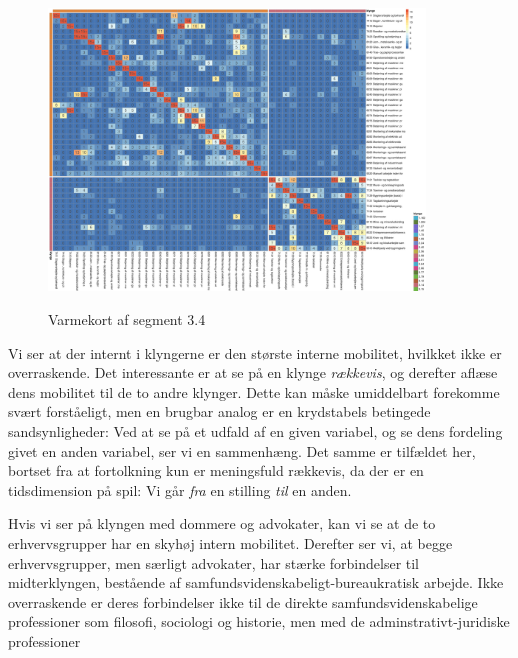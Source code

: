 % 
%
%
\begin{figure}
  \vspace{-20pt}
  \begin{center}
    \caption{Varmekort af segment 3.4}
      \includegraphics[width=10cm]{fig/heatmaps/seg3_4_RR_10.pdf}
    \label{fig delanalyse2 heatmap seg3.4 ledighed}
  \end{center}
  \vspace{-20pt}
\end{figure}

Vi ser at der internt i klyngerne er den største interne mobilitet, hvilkket ikke er overraskende. Det interessante er at se på en klynge \emph{rækkevis}, og derefter aflæse dens mobilitet til de to andre klynger. Dette kan måske umiddelbart forekomme svært forståeligt, men en brugbar analog er en krydstabels betingede sandsynligheder: Ved at se på et udfald af en given variabel, og se dens fordeling givet en anden variabel, ser vi en sammenhæng. Det samme er tilfældet her, bortset fra at fortolkning kun er meningsfuld rækkevis, da der er en tidsdimension på spil: Vi går \emph{fra} en stilling \emph{til} en anden. 

Hvis vi ser på klyngen med dommere og advokater, kan vi se at de to erhvervsgrupper har en skyhøj intern mobilitet. Derefter ser vi, at begge erhvervsgrupper, men særligt advokater, har stærke forbindelser til midterklyngen, bestående af samfundsvidenskabeligt-bureaukratisk arbejde. Ikke overraskende er deres forbindelser ikke til de direkte samfundsvidenskabelige professioner som filosofi, sociologi og historie, men med de adminstrativt-juridiske professioner 

